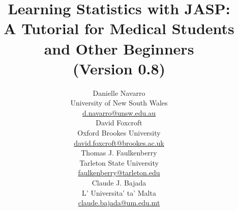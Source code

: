 


\title{Learning Statistics with JASP:\\ A Tutorial for Medical Students and Other Beginners \vspace*{18pt}
\\ (Version 0.8) \\ \vspace*{24pt}}
\author{Danielle Navarro \\ University of New South Wales \\ \url{d.navarro@unsw.edu.au} \vspace*{18pt} \\
David Foxcroft \\ Oxford Brookes University \\ \url{david.foxcroft@brookes.ac.uk} \vspace*{18pt} \\
Thomas J. Faulkenberry \\ Tarleton State University \\ \url{faulkenberry@tarleton.edu}\vspace*{18pt} \\
Claude J. Bajada \\ L' Universita' ta' Malta \\ \url{claude.bajada@um.edu.mt} \vspace*{36pt}} 


 
